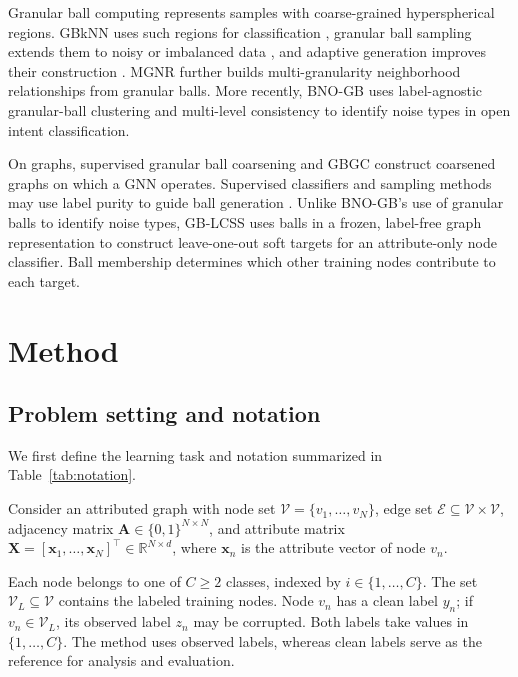\documentclass[times,review,10pt]{elsarticle}
\theoremstyle{definition}
\theoremstyle{plain}
\begin{document}
Granular ball computing represents samples with coarse-grained hyperspherical regions. GBkNN uses such regions for classification \cite{ref13}, granular ball sampling extends them to noisy or imbalanced data \cite{ref15}, and adaptive generation improves their construction \cite{ref16}. MGNR \cite{ref58} further builds multi-granularity neighborhood relationships from granular balls. More recently, BNO-GB \cite{pr2026bnogb} uses label-agnostic granular-ball clustering and multi-level consistency to identify noise types in open intent classification.

On graphs, supervised granular ball coarsening \cite{ref66} and GBGC \cite{ref67} construct coarsened graphs on which a GNN operates. Supervised classifiers and sampling methods may use label purity to guide ball generation \cite{ref13,ref15,ref16}. Unlike BNO-GB's use of granular balls to identify noise types, GB-LCSS uses balls in a frozen, label-free graph representation to construct leave-one-out soft targets for an attribute-only node classifier. Ball membership determines which other training nodes contribute to each target.
\section{Method}\label{sec:3}

\subsection{Problem setting and notation}\label{sec:3.1}

We first define the learning task and notation summarized in Table~\ref{tab:notation}.

Consider an attributed graph with node set \(\mathcal V=\{v_1,\ldots,v_N\}\), edge set \(\mathcal E\subseteq\mathcal V\times\mathcal V\), adjacency matrix \(\mathbf A\in\{0,1\}^{N\times N}\), and attribute matrix \(\mathbf X=[\mathbf x_1,\ldots,\mathbf x_N]^\top\in\mathbb R^{N\times d}\), where \(\mathbf x_n\) is the attribute vector of node \(v_n\).

Each node belongs to one of \(C\geq2\) classes, indexed by \(i\in\{1,\ldots,C\}\). The set \(\mathcal V_L\subseteq\mathcal V\) contains the labeled training nodes. Node \(v_n\) has a clean label \(y_n\); if \(v_n\in\mathcal V_L\), its observed label \(z_n\) may be corrupted. Both labels take values in \(\{1,\ldots,C\}\). The method uses observed labels, whereas clean labels serve as the reference for analysis and evaluation.
\end{document}

